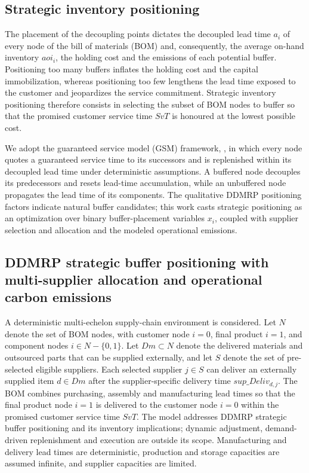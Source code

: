 \documentclass[preprint,12pt,authoryear]{elsarticle}
\begin{document}
\subsection{Strategic inventory positioning}
The placement of the decoupling points dictates the decoupled lead time $a_{i}$ of every node of the bill of materials (BOM) and, consequently, the average on-hand inventory $aoi_{i}$, the holding cost and the emissions of each potential buffer. Positioning too many buffers inflates the holding cost and the capital immobilization, whereas positioning too few lengthens the lead time exposed to the customer and jeopardizes the service commitment. Strategic inventory positioning therefore consists in selecting the subset of BOM nodes to buffer so that the promised customer service time $SvT$ is honoured at the lowest possible cost.

We adopt the guaranteed service model (GSM) framework, \citet{graves2000}, in which every node quotes a guaranteed service time to its successors and is replenished within its decoupled lead time under deterministic assumptions. A buffered node decouples its predecessors and resets lead-time accumulation, while an unbuffered node propagates the lead time of its components. The qualitative DDMRP positioning factors indicate natural buffer candidates; this work casts strategic positioning as an optimization over binary buffer-placement variables $x_i$, coupled with supplier selection and allocation and the modeled operational emissions.

\subsection{DDMRP strategic buffer positioning with multi-supplier allocation and operational carbon emissions}\label{ss:ddmrp}
A deterministic multi-echelon supply-chain environment is considered. Let $N$ denote the set of BOM nodes, with customer node $i=0$, final product $i=1$, and component nodes $i\in N-\{0,1\}$. Let $Dm\subset N$ denote the delivered materials and outsourced parts that can be supplied externally, and let $S$ denote the set of pre-selected eligible suppliers. Each selected supplier $j\in S$ can deliver an externally supplied item $d\in Dm$ after the supplier-specific delivery time $sup\_Deliv_{d,j}$. The BOM combines purchasing, assembly and manufacturing lead times so that the final product node $i=1$ is delivered to the customer node $i=0$ within the promised customer service time $SvT$. The model addresses DDMRP strategic buffer positioning and its inventory implications; dynamic adjustment, demand-driven replenishment and execution are outside its scope. Manufacturing and delivery lead times are deterministic, production and storage capacities are assumed infinite, and supplier capacities are limited.
\end{document}
